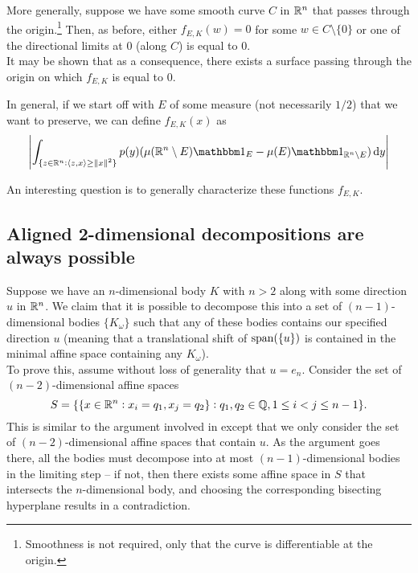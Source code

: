 \documentclass{article}
\begin{document}
		More generally, suppose we have some smooth curve $C$ in $\mathbb{R}^n$ that passes through the origin.\footnote{Smoothness is not required, only that the curve is differentiable at the origin.} Then, as before, either $f_{E,K}(w) = 0$ for some $w \in C \setminus \{0\}$ or one of the directional limits at $0$ (along $C$) is equal to $0$.\\

		It may be shown that as a consequence, there exists a surface passing through the origin on which $f_{E,K}$ is equal to $0$.

		In general, if we start off with $E$ of some measure (not necessarily $1/2$) that we want to preserve, we can define $f_{E,K}(x)$ as
		\[ \left| \int_{\{ z \in \Rn : \langle z , x \rangle \geq \norm{x}^2 \}} p(y) ( \mu(\Rn\setminus E)\indic_E - \mu(E)\indic_{\Rn \setminus E} ) \dif y \right| \]


		An interesting question is to generally characterize these functions $f_{E,K}$.

	\subsection{Aligned 2-dimensional decompositions are always possible}

		Suppose we have an $n$-dimensional body $K$ with $n>2$ along with some direction $u$ in $\mathbb{R}^n$. We claim that it is possible to decompose this into a set of $(n-1)$-dimensional bodies $\{K_\omega\}$ such that any of these bodies contains our specified direction $u$ (meaning that a translational shift of $\operatorname{span}(\{u\})$ is contained in the minimal affine space containing any $K_\omega$).\\

		To prove this, assume without loss of generality that $u = e_n$. Consider the set of $(n-2)$-dimensional affine spaces 
		\[ S = \{ \{x \in \mathbb{R}^n : x_i = q_1, x_j = q_2\} : q_1, q_2 \in \mathbb{Q}, 1 \leq i < j \leq n-1 \}. \]
		This is similar to the argument involved in \cite{lov-sim-on7} except that we only consider the set of $(n-2)$-dimensional affine spaces that contain $u$. As the argument goes there, all the bodies must decompose into at most $(n-1)$-dimensional bodies in the limiting step -- if not, then there exists some affine space in $S$ that intersects the $n$-dimensional body, and choosing the corresponding bisecting hyperplane results in a contradiction.\\
\end{document}
